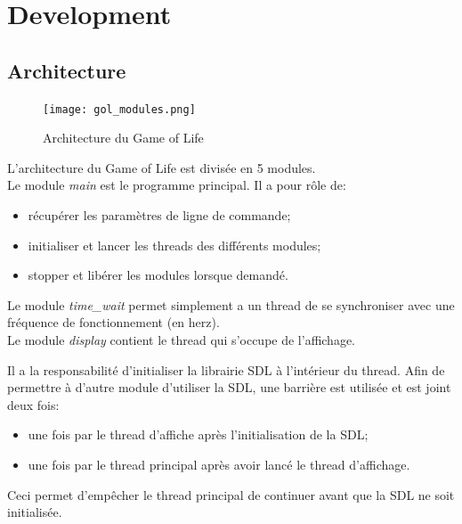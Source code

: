 \documentclass[11pt, a4paper]{article}
\begin{document}
\section{Development}
\subsection{Architecture}

\begin{figure}[H]
    \begin{center}
        \texttt{[image: gol\_modules.png]}
    \end{center}
    \caption{Architecture du Game of Life}
    \label{Architecture du Game of Life}
\end{figure}

L'architecture du Game of Life est divisée en 5 modules. \\

Le module \textit{main} est le programme principal.
Il a pour rôle de:

\begin{itemize}
    \item récupérer les paramètres de ligne de commande;
    \item initialiser et lancer les threads des différents modules;
    \item stopper et libérer les modules lorsque demandé. \\
\end{itemize}

Le module \textit{time\_wait} permet simplement a un thread
de se synchroniser avec une fréquence de fonctionnement (en herz). \\

Le module \textit{display} contient le thread qui s'occupe de l'affichage.

Il a la responsabilité d'initialiser la librairie SDL à l'intérieur du thread.
Afin de permettre à d'autre module d'utiliser la SDL, une barrière est utilisée et est joint deux fois:

\begin{itemize}
    \item une fois par le thread d'affiche après l'initialisation de la SDL;
    \item une fois par le thread principal après avoir lancé le thread d'affichage.
\end{itemize}

Ceci permet d'empêcher le thread principal de continuer avant que la SDL ne soit initialisée. \\
\end{document}
